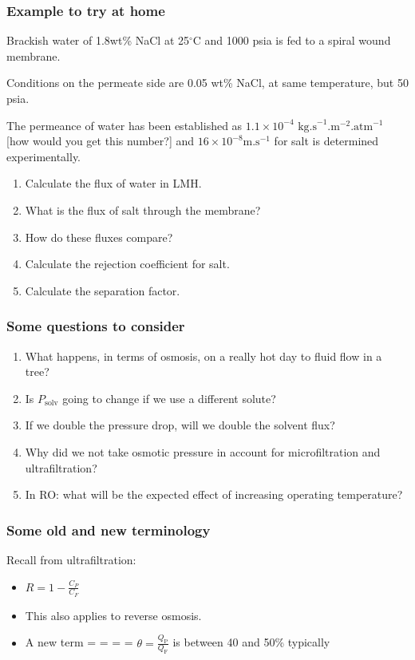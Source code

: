 \begin{frame}\frametitle{Example to try at home}
	Brackish water of 1.8wt\% NaCl at 25$^{\circ}\text{C}$ and 1000 psia is fed to a spiral wound membrane.
	
	\vspace{6pt}
	Conditions on the permeate side are 0.05 wt\% NaCl, at same temperature, but 50 psia.
	
	\vspace{6pt}
	The permeance of water has been established as $1.1 \times 10^{-4} \text{~kg.s}^{-1}\text{.m}^{-2}\text{.atm}^{-1}$ [how would you get this number?] and $16 \times 10^{-8} \text{m.s}^{-1}$ for salt is determined experimentally.
	
	\begin{enumerate}
		\item	Calculate the flux of water in LMH.
		\item	What is the flux of salt through the membrane?
		\item	How do these fluxes compare?
		\item	Calculate the rejection coefficient for salt.
		\item	Calculate the separation factor.
	\end{enumerate}
\end{frame}

\begin{frame}\frametitle{Some questions to consider}
	\begin{enumerate}
		\item	What happens, in terms of osmosis, on a really hot day to fluid flow in a tree?
		\item	Is $P_\text{solv}$ going to change if we use a different solute?
		\item	If we double the pressure drop, will we double the solvent flux?
		\item	Why did we not take osmotic pressure in account for microfiltration and ultrafiltration?
		\item	In RO: what will be the expected effect of increasing operating temperature?
	\end{enumerate}
\end{frame}

\begin{frame}\frametitle{Some old and new terminology}
	Recall from ultrafiltration:
	\begin{itemize}
		\item	$R = 1 - \displaystyle\frac{C_P}{C_F}$   
		
		\item	This {\color{purple}{rejection coefficient}} also applies to reverse osmosis.
		
		\item	A new term = {\color{purple}{cut}} = {\color{purple}{conversion}} = {\color{purple}{recovery}} = $\theta = \displaystyle \frac{Q_\text{P}}{Q_\text{F}}$ is between 40 and 50\% typically
	\end{itemize}	
\end{frame}

